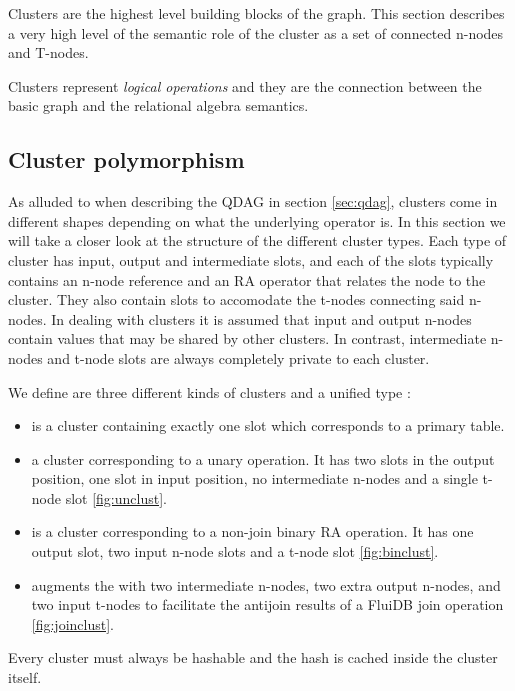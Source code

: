 Clusters are the highest level building blocks of the graph. This
section describes a very high level of the semantic role of the
cluster as a set of connected n-nodes and T-nodes.

Clusters represent \emph{logical operations} and they are the connection
between the basic graph and the relational algebra semantics.

\subsection{Cluster polymorphism}
\label{sec:cluster_polymorphism}

As alluded to when describing the QDAG in section \ref{sec:qdag},
clusters come in different shapes depending on what the underlying
operator is. In this section we will take a closer look at the
structure of the different cluster types. Each type of cluster has
input, output and intermediate slots, and each of the slots typically
contains an n-node reference and an
RA operator that relates
the node to the cluster. They also contain slots to accomodate the
t-nodes connecting said n-nodes. In dealing with clusters it is
assumed that input and output n-nodes contain values that may be shared
by other clusters. In contrast, intermediate n-nodes and t-node slots are
always completely private to each cluster.

We define are three different kinds of clusters and a unified type
:

\begin{itemize}
\item {} is a cluster containing exactly one slot which
  corresponds to a primary table.
\item {} a cluster corresponding to a unary operation. It
  has two slots in the output position, one slot in input position, no
  intermediate n-nodes and a single t-node slot \ref{fig:unclust}.
\item {} is a cluster corresponding to a non-join binary
  RA operation. It has one output slot, two input n-node slots and a
  t-node slot \ref{fig:binclust}.
\item {} augments the  with two
  intermediate n-nodes, two extra output n-nodes, and two input
  t-nodes to facilitate the antijoin results of a FluiDB join
  operation \ref{fig:joinclust}.
\end{itemize}

Every cluster must always be hashable and the hash is cached inside
the cluster itself.

